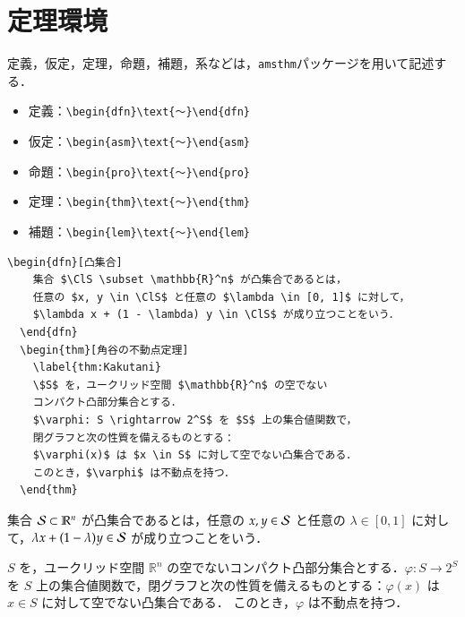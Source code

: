 \documentclass[../main/main]{subfiles}
\begin{document}
\section{定理環境}
定義，仮定，定理，命題，補題，系などは，\verb|amsthm|パッケージを用いて記述する．
\begin{itemize}
  \item 定義：\verb|\begin{dfn}\text{～}\end{dfn}|
  \item 仮定：\verb|\begin{asm}\text{～}\end{asm}|
  \item 命題：\verb|\begin{pro}\text{～}\end{pro}|
  \item 定理：\verb|\begin{thm}\text{～}\end{thm}|
  \item 補題：\verb|\begin{lem}\text{～}\end{lem}|
\end{itemize}
\begin{lstlisting}[language={[latex]TeX}]
  \begin{dfn}[凸集合]
    集合 $\ClS \subset \mathbb{R}^n$ が凸集合であるとは，
    任意の $x, y \in \ClS$ と任意の $\lambda \in [0, 1]$ に対して，
    $\lambda x + (1 - \lambda) y \in \ClS$ が成り立つことをいう．
  \end{dfn}
  \begin{thm}[角谷の不動点定理]
    \label{thm:Kakutani}
    \$S$ を，ユークリッド空間 $\mathbb{R}^n$ の空でない
    コンパクト凸部分集合とする．
    $\varphi: S \rightarrow 2^S$ を $S$ 上の集合値関数で，
    閉グラフと次の性質を備えるものとする：
    $\varphi(x)$ は $x \in S$ に対して空でない凸集合である．
    このとき，$\varphi$ は不動点を持つ．
  \end{thm}
\end{lstlisting}
\begin{dfn}[凸集合]
  集合 $\mathcal{S} \subset \mathbb{R}^n$ が凸集合であるとは，任意の $x, y \in \mathcal{S}$ と任意の $\lambda \in [0, 1]$ に対して，$\lambda x + (1 - \lambda) y \in \mathcal{S}$ が成り立つことをいう．
\end{dfn}
\begin{thm}[角谷の不動点定理]
  \label{thm:Kakutani}
  $S$ を，ユークリッド空間 $\mathbb{R}^n$ の空でないコンパクト凸部分集合とする．$\varphi: S \rightarrow 2^S$ を $S$ 上の集合値関数で，閉グラフと次の性質を備えるものとする：$\varphi(x)$ は $x \in S$ に対して空でない凸集合である．
  このとき，$\varphi$ は不動点を持つ．
\end{thm}
\end{document}
